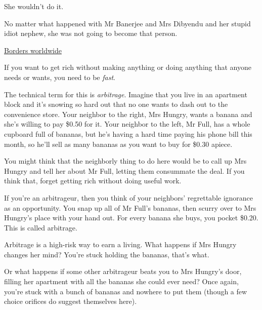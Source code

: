She wouldn't do it.

No matter what happened with Mr Banerjee and Mrs Dibyendu and her
stupid idiot nephew, she was not going to become that person.

\tb

{\href{http://www.bordersstores.com/locator/locator.jsp}{Borders worldwide}}

If you want to get rich without making anything or doing anything
that anyone needs or wants, you need to be \emph{fast}.

The technical term for this is \emph{arbitrage}. Imagine that you
live in an apartment block and it's snowing so hard out that no one
wants to dash out to the convenience store. Your neighbor to the
right, Mrs Hungry, wants a banana and she's willing to pay \$0.50
for it. Your neighbor to the left, Mr Full, has a whole cupboard
full of bananas, but he's having a hard time paying his phone bill
this month, so he'll sell as many bananas as you want to buy for
\$0.30 apiece.

You might think that the neighborly thing to do here would be to
call up Mrs Hungry and tell her about Mr Full, letting them
consummate the deal. If you think that, forget getting rich without
doing useful work.

If you're an arbitrageur, then you think of your neighbors'
regrettable ignorance as an opportunity. You snap up all of Mr
Full's bananas, then scurry over to Mrs Hungry's place with your
hand out. For every banana she buys, you pocket \$0.20. This is
called arbitrage.

Arbitrage is a high-risk way to earn a living. What happens if Mrs
Hungry changes her mind? You're stuck holding the bananas, that's
what.

Or what happens if some other arbitrageur beats you to Mrs Hungry's
door, filling her apartment with all the bananas she could ever
need? Once again, you're stuck with a bunch of bananas and nowhere
to put them (though a few choice orifices do suggest themselves
here).

